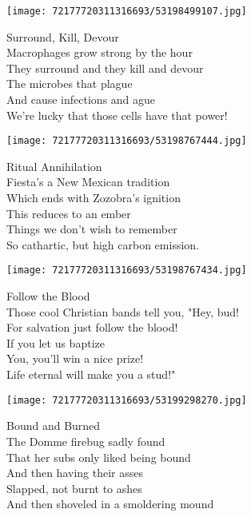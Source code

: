 \documentclass[10pt,letterpaper]{article}
\begin{document}
\begin{center}\texttt{[image: 72177720311316693/53198499107.jpg]}
\end{center}
\begin{center}
Surround, Kill, Devour\\
\vskip 0.2in
Macrophages grow strong by the hour\\
They surround and they kill and devour\\
The microbes that plague\\
And cause infections and ague\\
We're lucky that those cells have that power!\\
\end{center}
\pagebreak

\begin{center}\texttt{[image: 72177720311316693/53198767444.jpg]}
\end{center}
\begin{center}
Ritual Annihilation\\
\vskip 0.2in
Fiesta's a New Mexican tradition\\
Which ends with Zozobra's ignition\\
This reduces to an ember\\
Things we don't wish to remember\\
So cathartic, but high carbon emission.\\
\end{center}
\pagebreak

\begin{center}\texttt{[image: 72177720311316693/53198767434.jpg]}
\end{center}
\begin{center}
Follow the Blood\\
\vskip 0.2in
Those cool Christian bands tell you, "Hey, bud!\\
For salvation just follow the blood!\\
If you let us baptize\\
You, you'll win a nice prize!\\
Life eternal will make you a stud!"\\
\end{center}
\pagebreak

\begin{center}\texttt{[image: 72177720311316693/53199298270.jpg]}
\end{center}
\begin{center}
Bound and Burned\\
\vskip 0.2in
The Domme firebug sadly found\\
That her subs only liked being bound\\
And then having their asses\\
Slapped, not burnt to ashes\\
And then shoveled in a smoldering mound\\
\end{center}
\pagebreak
\end{document}
